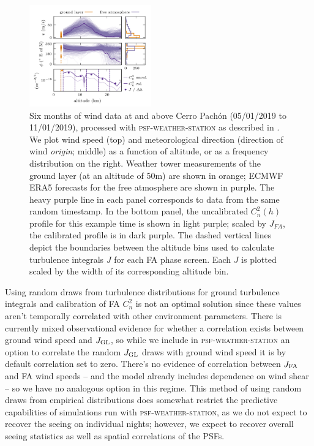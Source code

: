 \documentclass[twocolumn]{aastex631}
\newcommand{\psfws}{\textsc{psf-weather-station}\xspace}
\begin{document}
\begin{figure}
\includegraphics[width=0.47\textwidth]{inputs.png}
\caption{
    Six months of wind data at and above Cerro Pach\'on (05/01/2019 to 11/01/2019), processed with \psfws as described in .
    We plot wind speed (top) and meteorological direction (direction of wind \textsl{origin}; middle) as a function of altitude, or as a frequency distribution on the right. 
    Weather tower measurements of the ground layer (at an altitude of 50\unit{m}) are shown in orange; ECMWF ERA5 forecasts for the free atmosphere are shown in purple.
    The heavy purple line in each panel corresponds to data from the same random timestamp.
    In the bottom panel, the uncalibrated $C_n^2(h)$ profile for this example time is shown in light purple; scaled by $J_{FA}$, the calibrated profile is in dark purple. 
    The dashed vertical lines depict the boundaries between the altitude bins used to calculate turbulence integrals $J$ for each FA phase screen.
    Each $J$ is plotted scaled by the width of its corresponding altitude bin.
    \label{fig:inputs}
    }
\end{figure}

Using random draws from turbulence distributions for ground turbulence integrals and calibration of FA $C_n^2$ is not an optimal solution since these values aren't temporally correlated with other environment parameters. 
There is currently mixed observational evidence for whether a correlation exists between ground wind speed and $J_{\rm GL}$, so while we include in \psfws an option to correlate the random $J_{\rm GL}$ draws with ground wind speed it is by default correlation set to zero.
There's no evidence of correlation between $J_{\rm FA}$ and FA wind speeds -- and the model already includes dependence on wind shear -- so we have no analogous option in this regime. 
This method of using random draws from empirical distributions does somewhat restrict the predictive capabilities of simulations run with \psfws, as we do not expect to recover the seeing on individual nights; however, we expect to recover overall seeing statistics as well as spatial correlations of the PSFs. 
\end{document}
